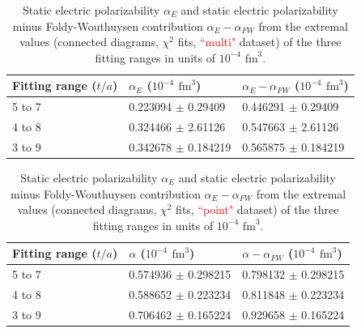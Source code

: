\begin{table}
\begin{center}
    \begin{tabular}{ | p{2cm}  | p{4cm} | p{4cm} | }
    \hline
     Fitting range ($t/a$) & $\alpha_E$ ($10^{-4}$ $\text{fm}^3$)    & $\alpha_E-\alpha_{FW}$ ($10^{-4}$ $\text{fm}^3$)       \\ 
     \hline
     5 to 7 &    0.223094 $\pm$ 0.29409      &   0.446291 $\pm$ 0.29409           \\ \hline
     4 to 8 &   0.324466 $\pm$ 2.61126       &    0.547663 $\pm$ 2.61126          \\ \hline
     3 to 9 &   0.342678 $\pm$ 0.184219        &      0.565875 $\pm$ 0.184219         \\ \hline
    \end{tabular}
\end{center}
\caption{ Static electric polarizability  $\alpha_E$ and static electric polarizability minus Foldy-Wouthuysen contribution $\alpha_E-\alpha_{FW}$ from the extremal values (connected diagrams, $\chi^2$ fits, \textcolor{red}{``multi"} dataset) of the three fitting ranges in units of $10^{-4}$ $\text{fm}^3$.}
\label{Tab:ConnectedPolarizabilitiesMulti}
\end{table}
\begin{table}
\begin{center}
    \begin{tabular}{ | p{2cm}  | p{4cm} | p{4cm} | }
    \hline
     Fitting range ($t/a$) & $\alpha$ ($10^{-4}$ $\text{fm}^3$)    & $\alpha-\alpha_{FW}$ ($10^{-4}$ $\text{fm}^3$)       \\ 
     \hline
     5 to 7 &    0.574936 $\pm$ 0.298215      &   0.798132 $\pm$ 0.298215           \\ \hline
     4 to 8 &   0.588652 $\pm$ 0.223234       &    0.811848 $\pm$ 0.223234          \\ \hline
     3 to 9 &  0.706462 $\pm$ 0.165224        &     0.929658 $\pm$ 0.165224          \\ \hline
    \end{tabular}
\end{center}
\caption{Static electric polarizability  $\alpha_E$ and static electric polarizability minus Foldy-Wouthuysen contribution $\alpha_E-\alpha_{FW}$ from the extremal values (connected diagrams, $\chi^2$ fits, \textcolor{red}{``point"} dataset) of the three fitting ranges in units of $10^{-4}$ $\text{fm}^3$.}
\label{Tab:ConnectedPolarizabilitiesPoint}
\end{table}




